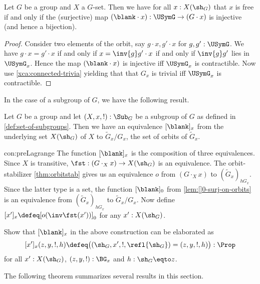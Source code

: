 \begin{lemma}\label{lem:free-pt-char}
  Let $G$ be a group and $X$ a $G$-set. Then we have for all $x:X(\sh_G)$
  that $x$ is free if and only if the (surjective) map
  $(\blank \cdot x) : \USymG \to (G\cdot x)$ is injective
  (and hence a bijection).
\end{lemma}
\begin{proof}
  Consider two elements of the orbit, say $g\cdot x,g'\cdot x$ for $g,g':\USymG$.
  We have $g\cdot x=g' \cdot x$ if and only if $x = \inv{g} g'\cdot x$
  if and only if $\inv{g} g'$ lies in $\USymG_x$.
  Hence the map $(\blank \cdot x)$ is injective iff $\USymG_x$ is contractible.
  Now use \cref{xca:connected-trivia} yielding that that 
  $G_x$ is trivial iff $\USymG_x$ is contractible.
\end{proof}

In the case of a subgroup of $G$, we have the following result.

\begin{construction}\label{con:preLagrange}
  Let $G$ be a group and let $(X,x,!):\Sub_G$ be a subgroup of $G$ as defined
  in \cref{def:set-of-subgroups}. Then we have an equivalence
  $[\blank]_x$ from the underlying set $X(\sh_G)$ of $X$ to 
  $\tilde G_x /G_x$, the set of orbits of $\tilde G_x$. 
\end{construction}
\begin{implementation}{con:preLagrange}
The function $[\blank]_x$ is the composition of three equivalences.
Since $X$ is transitive, $\fst: (G\cdot_X x)\to X(\sh_G)$ is an equivalence.
The orbit-stabilizer \cref{thm:orbitstab} gives us an equivalence $o$
from $(G\cdot_X x)$ to $(\tilde G_x)_{hG_x}$. Since the latter type is a set,
the function $[\blank]_0$ from \cref{lem:[]0-surj-on-orbits} 
is an equivalence from $(\tilde G_x)_{hG_x}$ to $\tilde G_x /G_x$.
Now define $[x']_x \defeq [o(\inv\fst(x'))]_0$ for any $x':X(\sh_G)$.
\end{implementation}

\begin{xca}\label{xca:preLagrange}
Show that $[\blank]_x$ in the above construction can be elaborated as
\[
[x']_x(z,y,!,h) \defeq \bigl((\sh_G,x',!,\refl{\sh_G})=(z,y,!,h)\bigr):\Prop
\]
for all $x':X(\sh_G)$, $(z,y,!):\BG_x$ and $h:\sh_G\eqto z$.
\end{xca}

The following theorem summarizes several results in this section.

